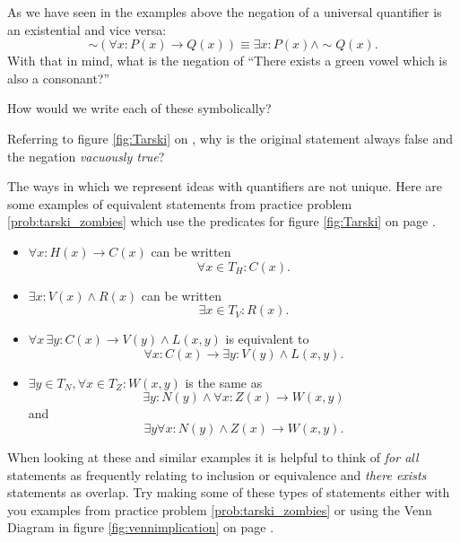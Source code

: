 \begin{exposition}

    As we have seen in the examples above the negation of a universal quantifier is an existential and vice versa:
    \[\sim\left(\forall x:P(x)\rightarrow Q(x)\right) \equiv \exists x: P(x) \wedge \sim Q(x).\]
    With that in mind, what is the negation of ``There exists a green vowel which is also a consonant?''\vspace{40pt}
    
    How would we write each of these symbolically? \vspace{40pt}
    
    Referring to figure \ref{fig:Tarski} on \pageref{fig:Tarski}, why is the original statement always false and the negation \emph{vacuously true}?\vspace{40pt}

    
    The ways in which we represent ideas with quantifiers are not unique.  Here are some examples of equivalent statements from practice problem \ref{prob:tarski_zombies} which use the predicates for figure \ref{fig:Tarski} on page \pageref{fig:Tarski}.
    \begin{itemize}
        \item \(\displaystyle\forall x: H(x)\rightarrow C(x)\) can be written \[\forall x\in T_H: C(x).\]
        \item \(\displaystyle\exists x: V(x)\wedge R(x)\) can be written \[\exists x\in T_V: R(x).\]
        \item \(\displaystyle\forall x\, \exists y: C(x)\rightarrow V(y)\wedge L(x,y)\) is equivalent to 
            \[\forall x: C(x)\rightarrow \exists y: V(y)\wedge L(x,y).\]
        \item \(\displaystyle\exists y\in T_N, \forall x\in T_Z: W(x,y)\) is the same as 
            \[\exists y: N(y) \wedge \forall x: Z(x)\rightarrow W(x,y)\] and 
            \[\exists y \forall x: N(y) \wedge Z(x) \rightarrow W(x,y).\]
    \end{itemize}
    When looking at these and similar examples it is helpful to think of \emph{for all} statements as frequently relating to inclusion or equivalence and \emph{there exists} statements as overlap.  Try making some of these types of statements either with you examples from practice problem \ref{prob:tarski_zombies} or using the Venn Diagram in figure \ref{fig:vennimplication} on page \pageref{fig:vennimplication}.
\end{exposition}